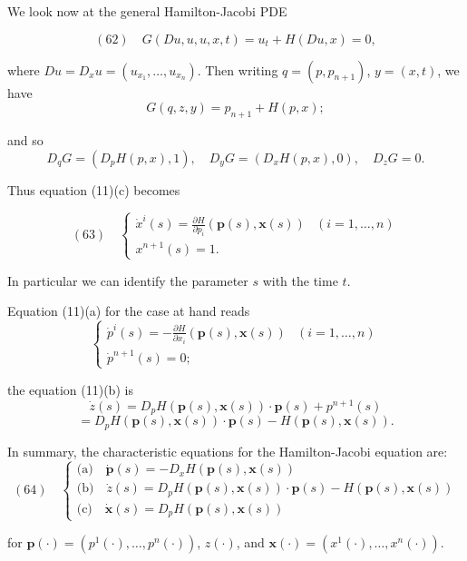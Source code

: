 \begin{example}
\label{ex:characteristics-hamilton-jacobi}
We look now at the general Hamilton-Jacobi PDE

$$(62) \quad G(Du, u, u, x, t) = u_t + H(Du, x) = 0,$$

where $Du = D_x u = (u_{x_1}, \ldots, u_{x_n})$. Then writing $q = (p, p_{n+1})$, $y = (x, t)$, we have
$$G(q, z, y) = p_{n+1} + H(p, x);$$

and so
$$D_q G = (D_p H(p, x), 1), \quad D_y G = (D_x H(p, x), 0), \quad D_z G = 0.$$

Thus equation (11)(c) becomes

$$(63) \quad \begin{cases} \dot{x}^i(s) = \frac{\partial H}{\partial p_i}(\mathbf{p}(s), \mathbf{x}(s)) & (i = 1, \ldots, n) \\ x^{n+1}(s) = 1. \end{cases}$$

In particular we can identify the parameter $s$ with the time $t$.

Equation (11)(a) for the case at hand reads
$$
\begin{cases}
\dot{p}^i(s) = -\frac{\partial H}{\partial x_i}(\mathbf{p}(s), \mathbf{x}(s)) & (i = 1, \ldots, n) \\
\dot{p}^{n+1}(s) = 0;
\end{cases}
$$

the equation (11)(b) is
$$
\dot{z}(s) = D_p H(\mathbf{p}(s), \mathbf{x}(s)) \cdot \mathbf{p}(s) + p^{n+1}(s)
$$
$$
= D_p H(\mathbf{p}(s), \mathbf{x}(s)) \cdot \mathbf{p}(s) - H(\mathbf{p}(s), \mathbf{x}(s)).
$$

In summary, the characteristic equations for the Hamilton-Jacobi equation are:
$$
(64) \quad
\begin{cases}
\text{(a)} \quad \dot{\mathbf{p}}(s) = -D_x H(\mathbf{p}(s), \mathbf{x}(s)) \\
\text{(b)} \quad \dot{z}(s) = D_p H(\mathbf{p}(s), \mathbf{x}(s)) \cdot \mathbf{p}(s) - H(\mathbf{p}(s), \mathbf{x}(s)) \\
\text{(c)} \quad \dot{\mathbf{x}}(s) = D_p H(\mathbf{p}(s), \mathbf{x}(s))
\end{cases}
$$

for $\mathbf{p}(\cdot) = (p^1(\cdot), \ldots, p^n(\cdot))$, $z(\cdot)$, and $\mathbf{x}(\cdot) = (x^1(\cdot), \ldots, x^n(\cdot))$.


\end{example}
